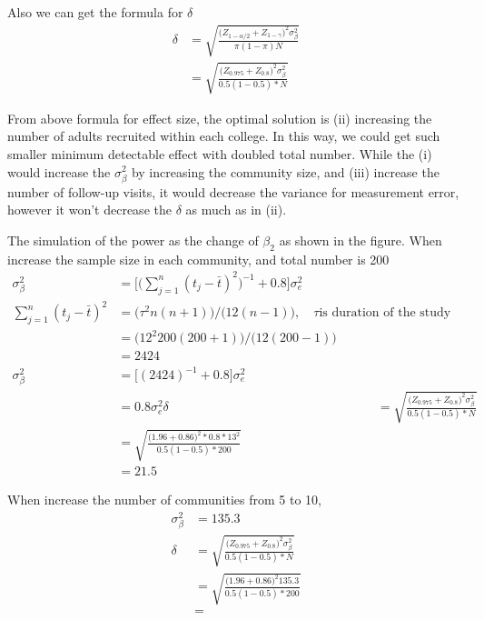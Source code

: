 \begin{itemize}
Also we can get the formula for $\delta$
\begin{align*}
\delta &= \sqrt{ \frac{\big(Z_{1-\alpha/2} + Z_{1-\gamma}\big)^2 \sigma_{\beta}^2}{\pi (1- \pi) N}} \\
&=  \sqrt{ \frac{\big(Z_{0.975} + Z_{0.8}\big)^2 \sigma_{\beta}^2}{0.5 (1- 0.5) * N}} 
\end{align*}	

From above formula for effect size, the optimal solution is (ii) increasing the number of adults recruited within each college. In this way, we could get such smaller minimum detectable effect with doubled total number. While the (i) would increase the $\sigma_{\beta}^2$ by increasing the community size, and (iii) increase the number of follow-up visits, it would decrease the variance for measurement error, however it won't decrease the $\delta$ as much as in (ii).

The simulation of the power as the change of $\beta_2$ as shown in the figure.
When increase the sample size in each community, and total number is 200
\begin{align*}
\sigma_{\beta}^2 &=\big[ \big( \sum_{j=1}^n (t_j - \bar{t})^2 \big)^{-1} + 0.8 \big ] \sigma_e^2 \\
\sum_{j=1}^n (t_j - \bar{t})^2 &= \big(\tau^2 n(n+1) \big)/ \big(12(n-1) \big) , \quad \tau \text{is duration of the study} \\
&= \big(12^2 200 (200+1) \big)/ \big(12( 200-1) \big) \\
&= 2424\\
\sigma_{\beta}^2 &= \big[ (2424 )^{-1} + 0.8 \big ] \sigma_e^2 \\
&= 0.8\sigma_e^2
\delta &= \sqrt{ \frac{\big(Z_{0.975} + Z_{0.8}\big)^2 \sigma_{\beta}^2}{0.5 (1- 0.5) * N}}  \\
&=  \sqrt{ \frac{\big(1.96 + 0.86 \big)^2* 0.8 * 13^2}{0.5 (1- 0.5) * 200}} \\
&= 21.5
\end{align*}

When increase the number of communities from 5 to 10, 
\begin{align*}
\sigma_{\beta}^2 &= 135.3\\
\delta &= \sqrt{ \frac{\big(Z_{0.975} + Z_{0.8}\big)^2 \sigma_{\beta}^2}{0.5 (1- 0.5) * N}}  \\
&=  \sqrt{ \frac{\big(1.96 + 0.86 \big)^2 135.3}{0.5 (1- 0.5) * 200}} \\
&= 
\end{align*}







\end{itemize}

